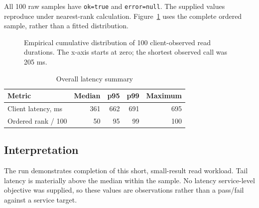 All 100 raw samples have \texttt{ok=true} and \texttt{error=null}. The supplied values reproduce under nearest-rank calculation. Figure~\ref{fig:cdf} uses the complete ordered sample, rather than a fitted distribution.

\vspace{3mm}
\hfill
{}\hfill
{}
\vspace{4mm}

\begin{figure}[h]\centering\caption{Empirical cumulative distribution of 100 client-observed read durations. The x-axis starts at zero; the shortest observed call was 205 ms.}\label{fig:cdf}\end{figure}

\begin{table}[h]\caption{Overall latency summary}\EvidenceTableStart
\begin{tabularx}{\linewidth}{@{}Xrrrr@{}}\toprule
Metric & Median & p95 & p99 & Maximum\\\midrule
Client latency, ms & 361 & 662 & 691 & 695\\
Ordered rank / 100 & 50 & 95 & 99 & 100\\\bottomrule
\end{tabularx}\end{table}

\subsection*{Interpretation}
The run demonstrates completion of this short, small-result read workload. Tail latency is materially above the median within the sample. No latency service-level objective was supplied, so these values are observations rather than a pass/fail against a service target.

